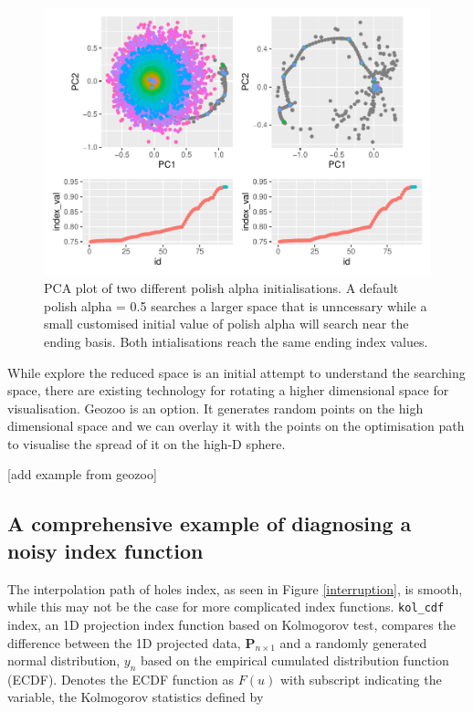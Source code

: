 \documentclass[12pt]{article}
\begin{document}
\begin{figure}
\centering
\includegraphics{paper_files/figure-latex/polish-alpha-1.pdf}
\caption{\label{polish-alpha}PCA plot of two different polish alpha
initialisations. A default polish alpha = 0.5 searches a larger space
that is unncessary while a small customised initial value of polish
alpha will search near the ending basis. Both intialisations reach the
same ending index values.}
\end{figure}

While explore the reduced space is an initial attempt to understand the
searching space, there are existing technology for rotating a higher
dimensional space for visualisation. Geozoo is an option. It generates
random points on the high dimensional space and we can overlay it with
the points on the optimisation path to visualise the spread of it on the
high-D sphere.

{[}add example from geozoo{]}

\newpage

\hypertarget{a-comprehensive-example-of-diagnosing-a-noisy-index-function}{%
\subsection{A comprehensive example of diagnosing a noisy index
function}\label{a-comprehensive-example-of-diagnosing-a-noisy-index-function}}

The interpolation path of holes index, as seen in Figure
\ref{interruption}, is smooth, while this may not be the case for more
complicated index functions. \texttt{kol\_cdf} index, an 1D projection
index function based on Kolmogorov test, compares the difference between
the 1D projected data, \(\mathbf{P}_{n \times 1}\) and a randomly
generated normal distribution, \(y_n\) based on the empirical cumulated
distribution function (ECDF). Denotes the ECDF function as \(F(u)\) with
subscript indicating the variable, the Kolmogorov statistics defined by
\end{document}
